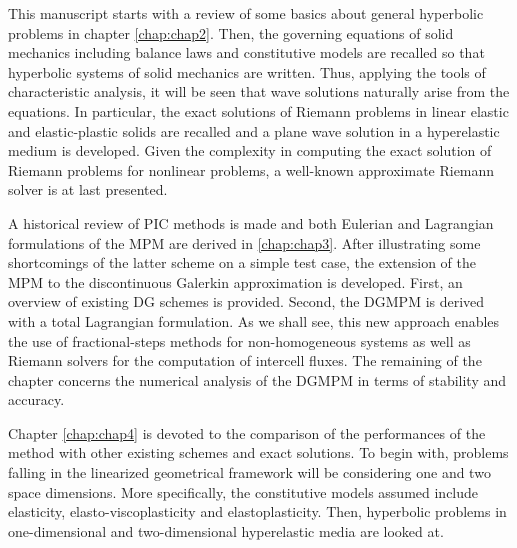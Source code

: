 This manuscript starts with a review of some basics about general hyperbolic problems in chapter \ref{chap:chap2}.
Then, the governing equations of solid mechanics including balance laws and constitutive models are recalled so that hyperbolic systems of solid mechanics are written.
Thus, applying the tools of characteristic analysis, it will be seen that wave solutions naturally arise from the equations. %
In particular, the exact solutions of Riemann problems in linear elastic and elastic-plastic solids are recalled and a plane wave solution in a hyperelastic medium is developed.
Given the complexity in computing the exact solution of Riemann problems for nonlinear problems, a well-known approximate Riemann solver is at last presented.


A historical review of PIC methods is made and both Eulerian and Lagrangian formulations of the MPM are derived in \ref{chap:chap3}.
After illustrating some shortcomings of the latter scheme on a simple test case, the extension of the MPM to the discontinuous Galerkin approximation is developed.
First, an overview of existing DG schemes is provided.
Second, the DGMPM is derived with a total Lagrangian formulation.
As we shall see, this new approach enables the use of fractional-steps methods for non-homogeneous systems as well as Riemann solvers for the computation of intercell fluxes.
The remaining of the chapter concerns the numerical analysis of the DGMPM in terms of stability and accuracy.


Chapter \ref{chap:chap4} is devoted to the comparison of the performances of the method with other existing schemes and exact solutions.
To begin with, problems falling in the linearized geometrical framework will be considering one and two space dimensions.
More specifically, the constitutive models assumed include elasticity, elasto-viscoplasticity and elastoplasticity.
Then, hyperbolic problems in one-dimensional and two-dimensional hyperelastic media are looked at.

